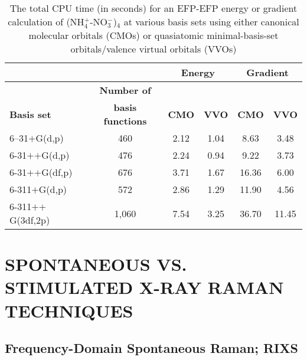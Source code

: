 \documentclass{ar-1col}
\begin{document}
\begin{table}
\caption{The total CPU time (in seconds) for an EFP-EFP energy or gradient calculation of (NH$_4^+$-NO$_3^-$)$_4$ at various basis sets using either canonical molecular orbitals (CMOs) or quasiatomic minimal-basis-set orbitals/valence virtual orbitals (VVOs)}
\label{tab1}
\begin{center}
\begin{tabular}{@{}l|c|c|c|c|c@{}}
\hline
&&\multicolumn{2}{c|}{{\bf Energy}} &\multicolumn{2}{c}{{\bf Gradient}}\\
\hline
&{\bf Number of}&&&&\\
{\bf Basis set} &{\bf basis functions} &{\bf CMO} &{\bf VVO} &{\bf CMO} &{\bf VVO}\\
\hline
6--31$+$G(d,p) &460 &2.12 &1.04 &8.63 &3.48\\
\hline
6-31$+$$+$G(d,p) &476 &2.24 &0.94 &9.22 &3.73\\
\hline
6-31$+$$+$G(df,p) &676 &3.71 &1.67 &16.36 &6.00\\
\hline
6-311$+$G(d,p) &572 &2.86 &1.29 &11.90 &4.56\\
\hline
6-311$+$$+$G(3df,2p) &1,060 &7.54 &3.25 &36.70 &11.45\\
\hline
\end{tabular}
\end{center}
\end{table}


\section{SPONTANEOUS VS. STIMULATED X-RAY RAMAN TECHNIQUES}


\subsection{Frequency-Domain Spontaneous Raman; RIXS}
\end{document}
